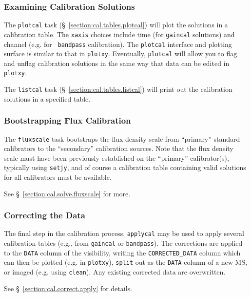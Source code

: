 \subsubsection{Examining Calibration Solutions}
\label{section:intro.walkthru.calib.plotcal}

The {\tt plotcal} task (\S~\ref{section:cal.tables.plotcal}) will plot the
solutions in a calibration table.  The {\tt xaxis} choices include
time (for {\tt gaincal} solutions) and channel (e.g. for {\tt
bandpass} calibration).  
The {\tt plotcal} interface and plotting surface is similar to that in
{\tt plotxy}.  Eventually, {\tt plotcal} will allow you to flag and
unflag calibration solutions in the same way that data can be edited
in {\tt plotxy}.

The {\tt listcal} task (\S~\ref{section:cal.tables.listcal}) will print out
the calibration solutions in a specified table.

\subsubsection{Bootstrapping Flux Calibration}
\label{section:intro.walkthru.calib.fluxscale}

The {\tt fluxscale} task bootstraps the flux density scale from
``primary'' standard calibrators to the ``secondary'' calibration
sources.  Note that the flux density scale must have been previously
established on the ``primary'' calibrator(s), typically using 
{\tt setjy}, and of course a calibration table containing
valid solutions for all calibrators must be available.

See \S~\ref{section:cal.solve.fluxscale} for more.

\subsubsection{Correcting the Data}
\label{section:intro.walkthru.calib.applycal}

The final step in the calibration process, {\tt applycal} may be used
to apply several calibration tables (e.g., from {\tt gaincal} or
{\tt bandpass}). 
The corrections are applied to the {\tt DATA} column of the
visibility, writing the {\tt CORRECTED\_DATA} column which can then be
plotted (e.g. in {\tt plotxy}), {\tt split} out as the {\tt DATA}
column of a new MS, or imaged (e.g. using {\tt clean}).  Any existing
corrected data are overwritten.

See \S~\ref{section:cal.correct.apply} for details.
 

